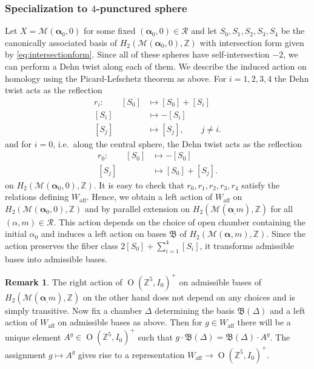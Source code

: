 \documentclass[12pt,letterpaper,reqno]{amsart}
\def\bm#1{#1}%
\def\mathbf#1{#1}%
\theoremstyle{remark}
\theoremstyle{definition}
\newtheorem{rem}[thm]{Remark}
\numberwithin{thm}{section}
\numberwithin{equation}{section}
\numberwithin{figure}{section}
\newcommand{\cM}{\ensuremath{\mathcal M}}
\newcommand{\Z}{\ensuremath{\mathbb Z}}
\newcommand{\bfalpha}{\ensuremath{\bm \alpha}}
\newcommand{\aff}{\mathrm{aff}}
\newcommand{\bfm}{\mathbf{m}}
\DeclareMathOperator{\OO}{O}
\begin{document}
\subsubsection{Specialization to \texorpdfstring{$4$}{4}-punctured sphere}
Let $X= \mathcal{M}(\boldsymbol{\alpha}_0, \mathbf{0})$ for some fixed $(\boldsymbol{\alpha}_0, \mathbf{0}) \in \mathcal{R}$ and let $S_0, S_1, S_2, S_3, S_4$
be the canonically associated basis of $H_2(\cM(\boldsymbol{\alpha}_0, \mathbf{0}), \Z)$ with intersection form given by \eqref{eq:intersectionform}. Since all of these spheres have self-intersection $-2$, we can perform a Dehn twist along each of them. We describe the induced action on homology using the Picard-Lefschetz theorem as above. For $i=1, 2, 3, 4$ the Dehn twist acts as the reflection
  \begin{align*}
    r_i: \qquad [S_0] &\mapsto [S_0] + [S_i]\\
    [S_i] &\mapsto -[S_i]\\
    [S_j] &\mapsto [S_j], \qquad j \neq i.
  \end{align*}
   and for $i=0$, i.e.\ along the central sphere, the Dehn twist acts as the reflection
  \begin{align*}
    r_0: \qquad [S_0] &\mapsto -[S_0]\\
    [S_j] &\mapsto [S_0]+[S_j].
  \end{align*}
on $H_2(\cM(\boldsymbol{\alpha}_0, \mathbf{0}), \Z)$. It is easy to check that $r_0, r_1, r_2, r_3, r_4$ satisfy the relations defining $W_\aff$. Hence, we obtain a left action of $W_\aff$ on $H_2(\cM(\boldsymbol{\alpha}_0, \mathbf{0}), \Z)$ and by parallel extension on $H_2(\cM(\boldsymbol{\alpha}_, \mathbf{m}), \Z)$ for all $(\bfalpha, \bfm) \in \mathcal{R}$. This action depends on the choice of open chamber containing the initial $\bfalpha_0$ and induces a left action on bases $\mathfrak{B}$ of $H_2(\cM(\boldsymbol{\alpha}, \mathbf{m}), \Z)$. Since the action preserves the fiber class $2[S_0] + \sum_{i=1}^4 [S_i]$, it transforms admissible bases into admissible bases. 
\begin{rem}\label{rem:compatibility}
The right action of $\OO(\Z^5,I_0)^+$ on admissible bases of $H_2(\cM(\boldsymbol{\alpha}_, \mathbf{m}), \Z)$ on the other hand does not depend on any choices and is simply transitive. Now fix a chamber $\Delta$ determining the basis $\mathfrak{B}(\Delta)$ and a left action of $W_\aff$ on admissible bases as above. Then for $g \in W_\aff$ there will be a unique element $A^g \in \OO(\Z^5,I_0)^+$ such that $g \cdot \mathfrak{B}(\Delta) = \mathfrak{B}(\Delta) \cdot A^g$. The assignment $g \mapsto A^g$ gives rise to a representation $W_\aff \to \OO(\Z^5, I_0)^+$.
\end{rem}
\end{document}

